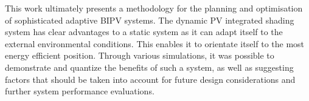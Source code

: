 This work ultimately presents a methodology for the planning and optimisation of sophisticated adaptive BIPV systems. The dynamic PV integrated shading system has clear advantages to a static system as it can adapt itself to the external environmental conditions. This enables it to orientate itself to the most energy efficient position. Through various simulations, it was possible to demonstrate and quantize the benefits of such a system, as well as suggesting factors that should be taken into account for future design considerations and further system performance evaluations. 